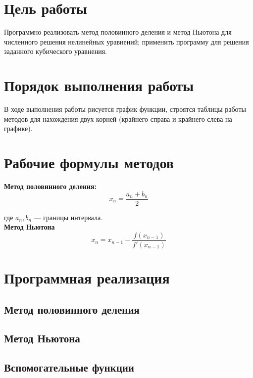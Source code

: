 \documentclass[listings]{labreport}
\begin{document}
\maketitlepage

\section*{Цель работы}

Программно реализовать метод половинного деления и метод Ньютона для численного
решения нелинейных уравнений; применить программу для решения заданного кубического уравнения.

\section*{Порядок выполнения работы}

В ходе выполнения работы рисуется график функции, строятся таблицы работы
методов для нахождения двух корней (крайнего справа и крайнего слева на графике).

\section*{Рабочие формулы методов}

\textbf{Метод половинного деления:} $$x_n = \frac{a_n + b_n}{2}$$

где $a_n, b_n$ — границы интервала.\\[4mm]

\textbf{Метод Ньютона} $$x_n = x_{n-1} - \frac{f(x_{n-1})}{f'(x_{n-1})}$$

\section*{Программная реализация}

\subsection*{Метод половинного деления}


\subsection*{Метод Ньютона}


\subsection*{Вспомогательные функции}

\end{document}
